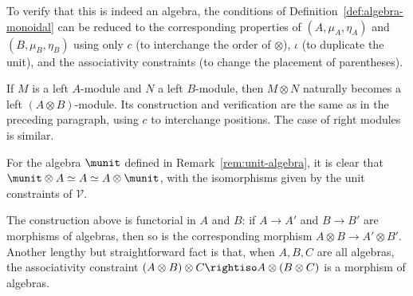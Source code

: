 To verify that this is indeed an algebra, the conditions of
Definition~\ref{def:algebra-monoidal} can be reduced to the corresponding
properties of $(A,\mu_A,\eta_A)$ and $(B,\mu_B,\eta_B)$ using only $c$ (to
interchange the order of $\otimes$), $\iota$ (to duplicate the unit), and the
associativity constraints (to change the placement of parentheses).

If $M$ is a left $A$-module and $N$ a left $B$-module, then $M\otimes N$
naturally becomes a left $(A\otimes B)$-module. Its construction and
verification are the same as in the preceding paragraph, using $c$ to
interchange positions. The case of right modules is similar.

For the algebra $\munit$ defined in Remark~\ref{rem:unit-algebra}, it is clear
that $\munit\otimes A\simeq A\simeq A\otimes\munit$, with the isomorphisms
given by the unit constraints of $\mathcal{V}$.

\begin{remark}\label{rem:Alg-otimes-functorial}
	The construction above is functorial in $A$ and $B$: if $A\to A'$ and
	$B\to B'$ are morphisms of algebras, then so is the corresponding morphism
	$A\otimes B\to A'\otimes B'$. Another lengthy but straightforward fact is
	that, when $A,B,C$ are all algebras, the associativity constraint
	$(A\otimes B)\otimes C\rightiso A\otimes(B\otimes C)$ is a morphism of
	algebras.
\end{remark}

